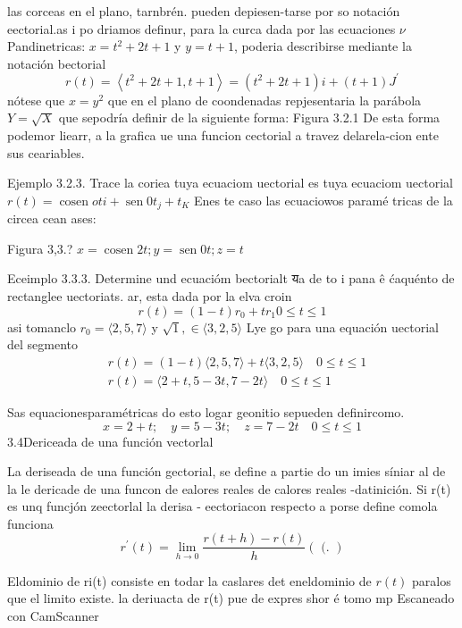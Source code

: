 

las corceas en el plano, tarnbrén. pueden depiesen-tarse por so notación eectorial.as i po driamos definur, para la curca dada por las ecuaciones
$\nu$ Pandinetricas: $x=t^2+2 t+1$ y $y=t+1$, poderia
describirse mediante la notación bectorial
$$
r(t)=\left\langle t^2+2 t+1, t+1\right\rangle=\left(t^2+2 t+1\right) i+(t+1) J^{\prime}
$$
nótese que $x=y^2$ que en el plano de coondenadas repjesentaria la parábola $Y=\sqrt{X}$ que sepodría definir de la siguiente forma:
Figura 3.2.1 De esta forma podemor liearr,
a la grafica ue una funcion
cectorial a travez delarela-cion ente sus ceariables.

Ejemplo 3.2.3. Trace la coriea
tuya ecuaciom uectorial es tuya ecuaciom uectorial
$r(t)=\operatorname{cosen} o t i+\operatorname{sen} 0 t_j+t{ }_K$ Enes te caso las ecuaciowos paramé tricas de la circea cean ases:

Figura 3,3.?
$x=\operatorname{cosen} 2 t ; y=\operatorname{sen} 0 t ; z=t$




Eceimplo 3.3.3. Determine und ecuacióm bectorialt यa de to i pana ê ćaquénto de rectanglee uectoriats. ar, esta dada por la elva croin
$$
r(t)=(1-t) r_0+t r_1 0 \leq t \leq 1
$$
asi tomanclo $r_0=\langle 2,5,7\rangle$ y $\sqrt{1}, \in\langle 3,2,5\rangle$ Lye go para una equación uectorial del segmento
$$
\begin{aligned}
	& r(t)=(1-t)\langle 2,5,7\rangle+t\langle 3,2,5\rangle \quad 0 \leq t \leq 1 \\
	& r(t)=\langle 2+t, 5-3 t, 7-2 t\rangle \quad 0 \leq t \leq 1
\end{aligned}
$$

Sas equacionesparamétricas do esto logar geonitio
sepueden definircomo.
$$
x=2+t ; \quad y=5-3 t ; \quad z=7-2 t \quad 0 \leqslant t \leqslant 1
$$
3.4Dericeada de una función vectorlal

La deriseada de una función gectorial, se define a partie
do un imies síniar al de la le dericade de una funcon
de ealores reales de calores reales
-datinición. Si r(t) es unq funcjón zeectorlal la derisa - eectoriacon respecto a porse define comola funciona
$$
r^{\prime}(t)=\lim _{h \rightarrow 0} \frac{r(t+h)-r(t)}{h}(\text { (. })
$$

Eldominio de ri(t) consiste en todar la caslares det
eneldominio de $r(t)$ paralos que el limito existe. la deriuacta de r(t) pue de expres shor é tomo mp
Escaneado con CamScanner


